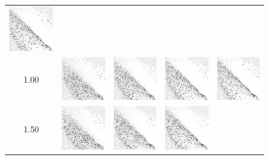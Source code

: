 \begin{figure}[h]
\begin{tabular}{c | c c c c}
			\includegraphics[width=2cm]{images/findings/experiments/learning_rate/lr_050_1mm.png} \\ %
		1.00 & 
			\includegraphics[width=2cm]{images/findings/experiments/learning_rate/lr_100_250.png} & %
			\includegraphics[width=2cm]{images/findings/experiments/learning_rate/lr_100_500.png} & %
			\includegraphics[width=2cm]{images/findings/experiments/learning_rate/lr_100_750.png} & %
			\includegraphics[width=2cm]{images/findings/experiments/learning_rate/lr_100_1mm.png} \\ %
		1.50 & 
			\includegraphics[width=2cm]{images/findings/experiments/learning_rate/lr_150_250.png} & %
			\includegraphics[width=2cm]{images/findings/experiments/learning_rate/lr_150_500.png} & %
			\includegraphics[width=2cm]{images/findings/experiments/learning_rate/lr_150_750.png} & %

\end{tabular}
\end{figure}
